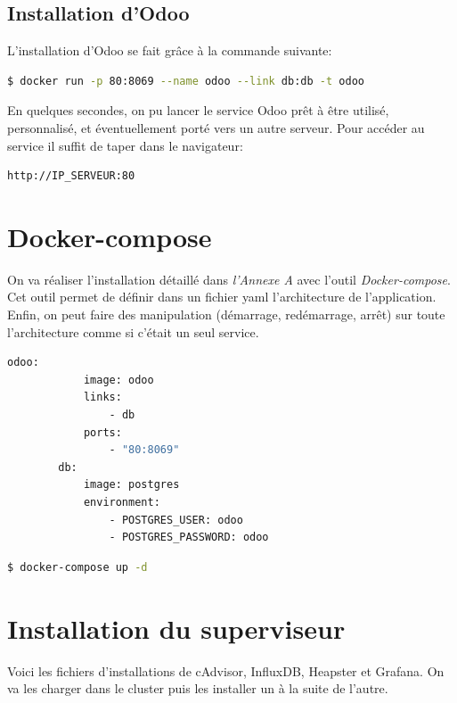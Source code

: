 \section*{Installation d'Odoo}

	L'installation d'Odoo se fait grâce à la commande suivante:
	\begin{lstlisting}[language=bash,caption=Installation d'Odoo]
		$ docker run -p 80:8069 --name odoo --link db:db -t odoo
	\end{lstlisting}

	En quelques secondes, on pu lancer le service Odoo prêt à être utilisé, personnalisé, et éventuellement porté vers un autre serveur. Pour accéder au service il suffit de taper dans le navigateur:

	\begin{lstlisting}[language=bash]
		http://IP_SERVEUR:80
	\end{lstlisting}

	




\chapter{Docker-compose}

	On va réaliser l'installation détaillé dans \emph{l'Annexe A} avec l'outil \emph{Docker-compose}. Cet outil permet de définir dans un fichier \acrshort{yaml} l'architecture de l'application. Enfin, on peut faire des manipulation (démarrage, redémarrage, arrêt) sur toute l'architecture comme si c'était un seul service.

	\begin{lstlisting}[language=bash,caption=Installation d'Odoo avec Docker-compose]
		odoo:
	  		image: odoo
		  	links:
		   		- db
		  	ports:
		   		- "80:8069"
		db:
		  	image: postgres
		  	environment:
  				- POSTGRES_USER: odoo
  				- POSTGRES_PASSWORD: odoo
	\end{lstlisting}

	\begin{lstlisting}[language=bash,caption=Lancement d'Odoo avec Docker-compose]
		$ docker-compose up -d
	\end{lstlisting}


\chapter{Installation du superviseur}
	
	Voici les fichiers d'installations de cAdvisor, InfluxDB, Heapster et Grafana. On va les charger dans le cluster puis les installer un à la suite de l'autre.

